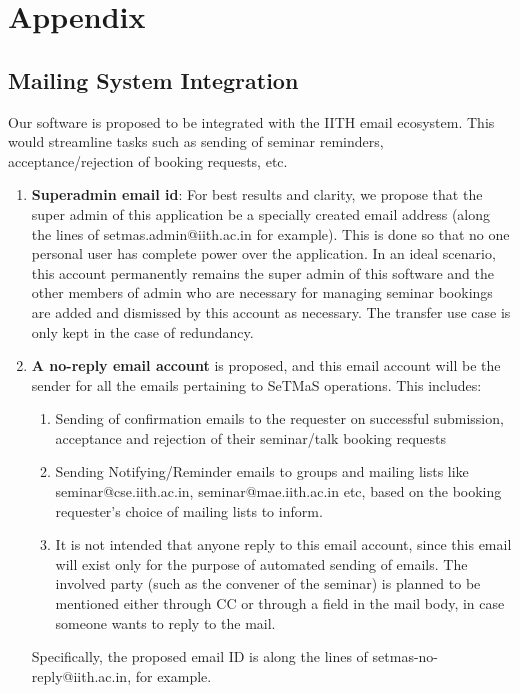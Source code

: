 \documentclass{article}
\begin{document}
\section{Appendix}
\label{mail_appendix}
\subsection{Mailing System Integration}
Our software is proposed to be integrated with the IITH email ecosystem. This would streamline tasks such as sending of seminar reminders, acceptance/rejection of booking requests, etc.
\begin{enumerate}
    \item \textbf{Superadmin email id}: For best results and clarity, we propose that the super admin of this application be a specially created email address (along the lines of setmas.admin@iith.ac.in for example). This is done so that no one personal user has complete power over the application. In an ideal scenario, this account permanently remains the super admin of this software and the other members of admin who are necessary for managing seminar bookings are added and dismissed by this account as necessary. The transfer use case is only kept in the case of redundancy.
    \item \textbf{A no-reply email account} is proposed, and this email account will be the sender for all the emails pertaining to SeTMaS operations. This includes: \begin{enumerate}
        \item Sending of confirmation emails to the requester on successful submission, acceptance and rejection of their seminar/talk booking requests
        \item Sending Notifying/Reminder emails to groups and mailing lists like seminar@cse.iith.ac.in, seminar@mae.iith.ac.in etc, based on the booking requester's choice of mailing lists to inform.
        \item It is not intended that anyone reply to this email account, since this email will exist only for the purpose of automated sending of emails. The involved party (such as the convener of the seminar) is planned to be mentioned either through CC or through a field in the mail body, in case someone wants to reply to the mail.
    \end{enumerate}
    Specifically, the proposed email ID is along the lines of setmas-no-reply@iith.ac.in, for example. 
\end{enumerate}
\end{document}
